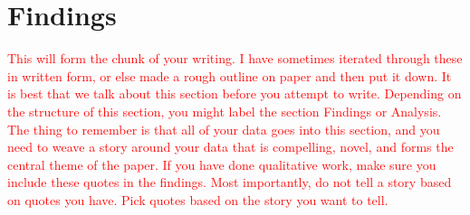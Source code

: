 \section{Findings}
\textcolor{red}{This will form the chunk of your writing. I have sometimes iterated through these in written form, or else made a rough outline  on paper and then put it down. It is best that we talk about this section before you attempt to write. Depending on the structure of this section, you might label the section Findings or Analysis. The thing to remember is that all of your data goes into this section, and you need to weave a story around your data that is compelling, novel, and forms the central theme of the paper. If you have done qualitative work, make sure you include these quotes in the findings. Most importantly, do not tell a story based on quotes you have. Pick quotes based on the story you want to tell. 
}